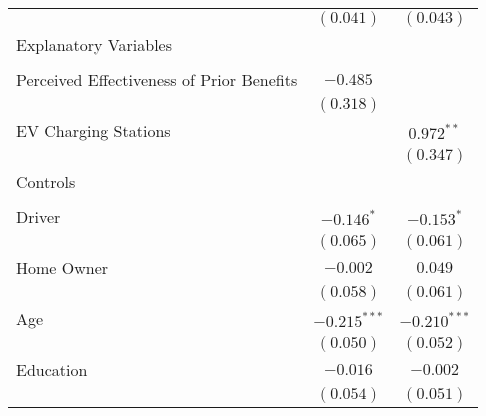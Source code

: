\begin{center}
\begin{tiny}
\begin{longtable}{l@{} c@{} c@{}}
                                                                           & $(0.041)$        & $(0.043)$        \\
Explanatory Variables                                                      &                  &                  \\
                                                                           &                  &                  \\
\quad Perceived Effectiveness of Prior Benefits                            & $-0.485$         &                  \\
                                                                           & $(0.318)$        &                  \\
\quad EV Charging Stations                                                 &                  & $0.972^{**}$     \\
                                                                           &                  & $(0.347)$        \\
Controls                                                                   &                  &                  \\
                                                                           &                  &                  \\
\quad Driver                                                               & $-0.146^{*}$     & $-0.153^{*}$     \\
                                                                           & $(0.065)$        & $(0.061)$        \\
\quad Home Owner                                                           & $-0.002$         & $0.049$          \\
                                                                           & $(0.058)$        & $(0.061)$        \\
\quad Age                                                                  & $-0.215^{***}$   & $-0.210^{***}$   \\
                                                                           & $(0.050)$        & $(0.052)$        \\
\quad Education                                                            & $-0.016$         & $-0.002$         \\
                                                                           & $(0.054)$        & $(0.051)$        \\

\end{longtable}
\end{tiny}
\end{center}
